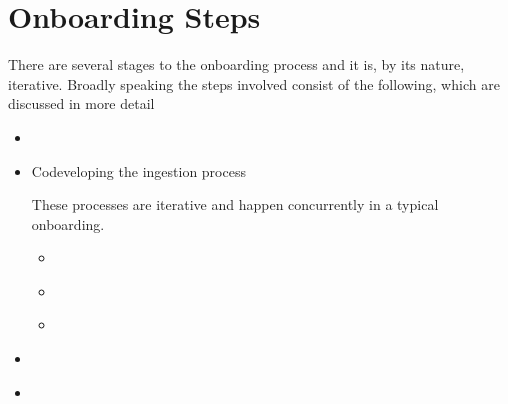 \documentclass[letterpaper,10pt,english]{sphinxmanual}
\begin{document}
\section{Onboarding Steps}
\label{\detokenize{index:onboarding-steps}}
\sphinxAtStartPar
There are several stages to the onboarding process and it is, by its nature, iterative. Broadly speaking the steps involved consist of the following, which are discussed in more detail
\begin{itemize}
\item {}
\sphinxAtStartPar
{\hyperref[\detokenize{index:prelim}]{}}

\item {}
\sphinxAtStartPar
Co\sphinxhyphen{}developing the ingestion process %
\begin{footnote}[1]\sphinxAtStartFootnote
These processes are iterative and happen concurrently in a typical onboarding.
%
\end{footnote}
\begin{itemize}
\item {}
\sphinxAtStartPar
{\hyperref[\detokenize{index:gathering-data}]{}}

\item {}
\sphinxAtStartPar
{\hyperref[\detokenize{index:ingestion-strat}]{}}

\item {}
\sphinxAtStartPar
{\hyperref[\detokenize{index:modding-scripts}]{}}

\end{itemize}

\item {}
\sphinxAtStartPar
{\hyperref[\detokenize{index:testing}]{}}

\item {}
\sphinxAtStartPar
{\hyperref[\detokenize{index:going-live}]{}}

\end{itemize}
\end{document}
